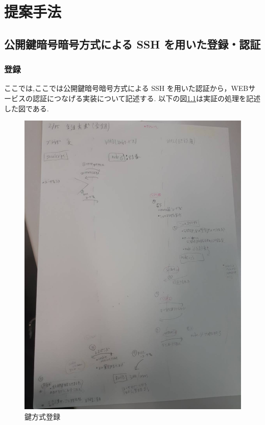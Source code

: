 \chapter{提案手法}
\label{chap:propose}

\section{公開鍵暗号暗号方式による SSH を用いた登録・認証}
    \subsection{登録}
        ここでは,ここでは公開鍵暗号暗号方式による SSH を用いた認証から，WEBサービスの認証につなげる実装について記述する.
        以下の図\ref{registration}は実証の処理を記述した図である.
        \begin{figure}[H]
            \includegraphics[width=13cm]{fig/chapter3/registration/picture/2156.jpg}
            \caption{鍵方式登録}
            \label{registration}
        \end{figure}
